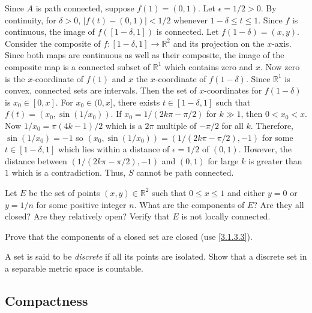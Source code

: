 \begin{exercise}[ref = \arabic{exercisei}]
  Since \(A\) is path connected, suppose \(f(1) = (0,1)\).
  Let \(\epsilon = 1/2 > 0\).
  By continuity, for \(\delta > 0\), \(\lvert f(t) - (0,1)\rvert < 1/2\)
  whenever \(1 - \delta\leq t\leq 1\).
  Since \(f\) is continuous, the image of \(f([1 - \delta,1])\) is connected.
  Let \(f(1- \delta) = (x,y)\).
  Consider the composite of \(f\colon [1 - \delta,1]\to\mathbb{R}^2\) and its
  projection on the \(x\)-axis.
  Since both maps are continuous as well as their composite, the image of the
  composite map is a connected subset of \(\mathbb{R}^1\) which contains zero
  and \(x\).
  Now zero is the \(x\)-coordinate of \(f(1)\) and \(x\) the \(x\)-coordinate
  of \(f(1 - \delta)\).
  Since \(\mathbb{R}^1\) is convex, connected sets are intervals.
  Then the set of \(x\)-coordinates for \(f(1 - \delta)\) is \(x_0\in[0,x]\).
  For \(x_0\in(0,x]\), there exists \(t\in[1 - \delta,1]\) such that
  \(f(t) = (x_0,\sin(1/x_0))\).
  If \(x_0 = 1/(2k\pi - \pi/2)\) for \(k\gg 1\), then \(0 < x_0 < x\).
  Now \(1/x_0 = \pi(4k - 1)/2\) which is a \(2\pi\) multiple of \(-\pi/2\) for
  all \(k\).
  Therefore, \(\sin(1/x_0) = -1\) so
  \((x_0, \sin(1/x_0)) = (1/(2k\pi - \pi/2),-1)\) for some
  \(t\in[1 - \delta,1]\) which lies within a distance of \(\epsilon = 1/2\) of
  \((0,1)\).
  However, the distance between \((1/(2k\pi - \pi/2),-1)\) and \((0,1)\) for
  large \(k\) is greater than \(1\) which is a contradiction.
  Thus, \(S\) cannot be path connected.
\item
  Let \(E\) be the set of points \((x,y)\in\mathbb{R}^2\) such that
  \(0\leq x\leq 1\) and either \(y = 0\) or \(y = 1/n\) for some positive
  integer \(n\).
  What are the components of \(E\)?
  Are they all closed?
  Are they relatively open?
  Verify that \(E\) is not locally connected.
\item
  Prove that the components of a closed set are closed (use \cref{3.1.3.3}).
\item
  A set is said to be \textit{discrete} if all its points are isolated.
  Show that a discrete set in a separable metric space is countable.
\end{exercise}

\subsection{Compactness}

